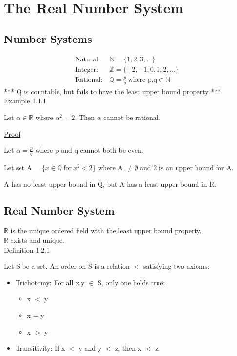 \newpage
\section[Day 1: The Real Number System]{The Real Number System}





\subsection{Number Systems}

\begin{align*}
	\text{Natural}:\ & \mathbb{N} = \{1, 2, 3, ... \} \\	
	\text{Integer}:\ & \mathbb{Z} = \{-2, -1, 0, 1, 2, ... \} \\
	\text{Rational}:\ & \mathbb{Q} = \frac{p}{q} \ \text{where p,q} \in \mathbb{N}
\end{align*}
*** Q is countable, but fails to have the least upper bound property *** \\

{ \color{purple} Example 1.1.1 }

\qquad Let $ \alpha \in \mathbb{R} $ where $ \alpha^2 = 2 $. Then $ \alpha $ cannot be rational.

{ \color{magenta} \underline{Proof} }

Let $ \alpha = \frac{p}{q} $ where p and q cannot both be even.

Let set A = $\{ x \in \mathbb{Q} \ \text{for} \ x^2 < 2 \} $ where A $ \neq \emptyset $
and 2 is an upper bound for A.

A has no least upper bound in Q, but A has a least upper bound in R.





\subsection{Real Number System}

$ \mathbb{R} $ is the unique ordered field with the least upper bound property. \\
$ \mathbb{R} $ exists and unique. \\

{ \color{blue} Definition 1.2.1 }

\qquad Let S be a set. An order on S is a relation $<$ satisfying two axioms:

\begin{itemize}[leftmargin=2cm]
	\item { \color{lblue} Trichotomy}: For all x,y $ \in $ S, only one holds true:
		\begin{itemize}[leftmargin=2cm]
			\item x $<$ y
			\item x = y
			\item x $>$ y
		\end{itemize}
	
	\item { \color{lblue} Transitivity}: If x $<$ y and y $<$ z, then x $<$ z.
\end{itemize}

